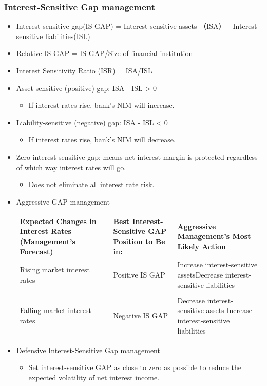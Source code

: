 \subsubsection{Interest-Sensitive Gap management}
\begin{itemize}
\item Interest-sensitive gap(IS GAP) = Interest-sensitive assets （ISA） - Interest-sensitive liabilities(ISL)
\item Relative IS GAP = IS GAP/Size of financial institution
\item Interest Sensitivity Ratio (ISR) = ISA/ISL
\item Asset-sensitive (positive) gap: ISA - ISL > 0
    \begin{itemize}
    \item If interest rates rise, bank's NIM will increase.
    \end{itemize}
\item Liability-sensitive (negative) gap: ISA - ISL < 0
    \begin{itemize}
    \item If interest rates rise, bank's NIM will decrease.
    \end{itemize}
\item Zero interest-sensitive gap: means net interest margin is protected regardless of which way interest rates will go.
    \begin{itemize}
    \item Does not eliminate all interest rate risk.
    \end{itemize}
\item Aggressive GAP management

    \begin{tabular}{|p{5cm}|p{5cm}|p{6cm}|}
        \hline

    \textbf{Expected Changes in Interest Rates (Management's Forecast)} & \textbf{Best Interest-Sensitive GAP Position to Be in:} & \textbf{Aggressive Management's Most Likely Action} \\
    \hline

    Rising market interest rates & Positive IS GAP & Increase interest-sensitive assets\newline Decrease interest-sensitive liabilities  \\
    \hline
     &  &  \\
    Falling market interest rates & Negative IS GAP & Decrease interest-sensitive assets \newline Increase interest-sensitive liabilities \\
    
     \hline

    \end{tabular}   
\item Defensive Interest-Sensitive Gap management
    \begin{itemize}
    \item Set interest-sensitive GAP as close to zero as possible to reduce the expected volatility of net interest income.
    \end{itemize}
\end{itemize}



